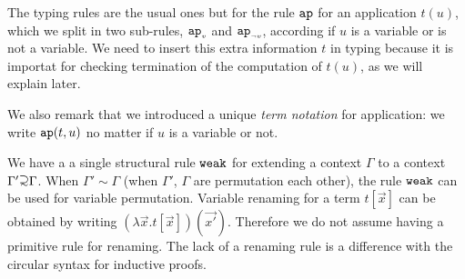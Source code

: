 \documentclass{article}
\begin{document}
The typing rules are the usual ones but for %
the rule ${\tt ap}$ for an application $t(u)$, which we split in two sub-rules, ${{\tt ap}_{\mbox{\tiny $v$}}}$
and ${{\tt ap}_{\mbox{\tiny $\neg v$}}}$, according if $u$ is a variable or is not a variable.
We need to insert this extra information $t$ in typing because it is importat for checking termination
of the computation of $t(u)$, as we will explain later.

We also remark that we introduced a unique \emph{term notation}
for application: we write ${\tt ap}(t,u)$ no matter if $u$ is a variable or not.

We have a a single structural rule ${\tt weak}$ for extending a context $\Gamma$ to a context 
$\Gamma' \supseteqsim \Gamma$. When $\Gamma' \sim \Gamma$ (when 
$\Gamma'$, $\Gamma$ are permutation each other), 
the rule ${\tt weak}$ can be used for variable permutation.
Variable renaming for a term $t[\vec{x}]$ can be obtained by writing 
$(\lambda \vec{x}.t[\vec{x}])(\vec{x'})$. 
Therefore we do not assume having a primitive rule for renaming. 
The lack of a renaming rule is a difference with the circular syntax for inductive proofs.

\end{document}
